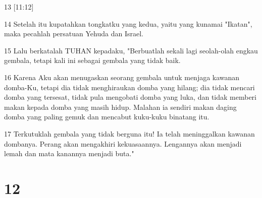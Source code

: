\par 13 [11:12]
\par 14 Setelah itu kupatahkan tongkatku yang kedua, yaitu yang kunamai "Ikatan", maka pecahlah persatuan Yehuda dan Israel.
\par 15 Lalu berkatalah TUHAN kepadaku, "Berbuatlah sekali lagi seolah-olah engkau gembala, tetapi kali ini sebagai gembala yang tidak baik.
\par 16 Karena Aku akan menugaskan seorang gembala untuk menjaga kawanan domba-Ku, tetapi dia tidak menghiraukan domba yang hilang; dia tidak mencari domba yang tersesat, tidak pula mengobati domba yang luka, dan tidak memberi makan kepada domba yang masih hidup. Malahan ia sendiri makan daging domba yang paling gemuk dan mencabut kuku-kuku binatang itu.
\par 17 Terkutuklah gembala yang tidak berguna itu! Ia telah meninggalkan kawanan dombanya. Perang akan mengakhiri kekuasaannya. Lengannya akan menjadi lemah dan mata kanannya menjadi buta."

\chapter{12}

